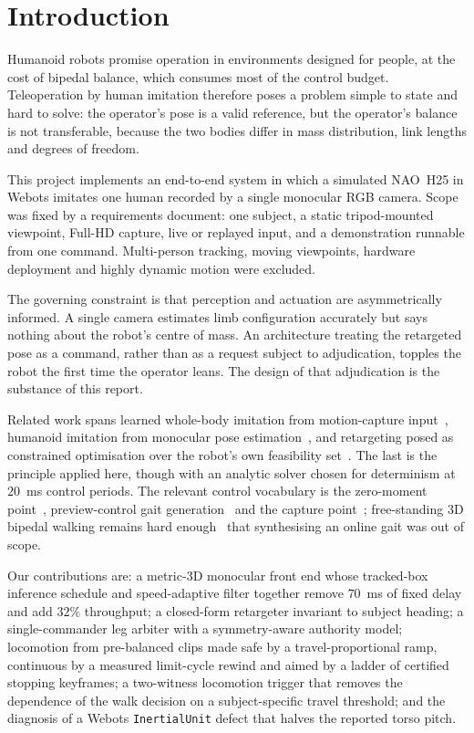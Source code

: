 \documentclass[twocolumn]{article}
\begin{document}
\section{Introduction}

Humanoid robots promise operation in environments designed for people, at the cost of bipedal
balance, which consumes most of the control budget. Teleoperation by human imitation therefore
poses a problem simple to state and hard to solve: the operator's pose is a valid reference,
but the operator's balance is not transferable, because the two bodies differ in mass
distribution, link lengths and degrees of freedom.

This project implements an end-to-end system in which a simulated NAO~H25 in Webots imitates
one human recorded by a single monocular RGB camera. Scope was fixed by a requirements
document: one subject, a static tripod-mounted viewpoint, Full-HD capture, live or replayed
input, and a demonstration runnable from one command. Multi-person tracking, moving
viewpoints, hardware deployment and highly dynamic motion were excluded.

The governing constraint is that perception and actuation are asymmetrically informed. A
single camera estimates limb configuration accurately but says nothing about the robot's
centre of mass. An architecture treating the retargeted pose as a command, rather than as a
request subject to adjudication, topples the robot the first time the operator leans. The
design of that adjudication is the substance of this report.

Related work spans learned whole-body imitation from motion-capture input~\cite{ze2025twist},
humanoid imitation from monocular pose estimation~\cite{tao2021visual}, and retargeting posed
as constrained optimisation over the robot's own feasibility set~\cite{penco2018teleoperation}.
The last is the principle applied here, though with an analytic solver chosen for determinism
at $20$~ms control periods. The relevant control vocabulary is the zero-moment
point~\cite{vukobratovic2004zmp}, preview-control gait generation~\cite{kajita2003biped} and
the capture point~\cite{pratt2006capture}; free-standing 3D bipedal walking remains hard
enough~\cite{grizzle2014models} that synthesising an online gait was out of scope.

Our contributions are: a metric-3D monocular front end whose tracked-box inference schedule
and speed-adaptive filter together remove $70$~ms of fixed delay and add $32\%$ throughput; a
closed-form retargeter invariant to subject heading; a single-commander leg arbiter with a
symmetry-aware authority model; locomotion from pre-balanced clips made safe by a
travel-proportional ramp, continuous by a measured limit-cycle rewind and aimed by a ladder of
certified stopping keyframes; a two-witness locomotion trigger that removes the dependence of
the walk decision on a subject-specific travel threshold; and the diagnosis of a Webots
\texttt{InertialUnit} defect that halves the reported torso pitch.
\end{document}

